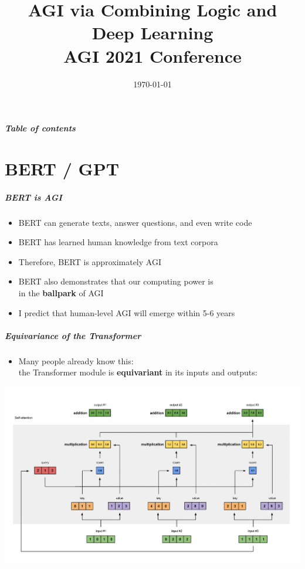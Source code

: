 \documentclass[16pt]{beamer}
\title[AGI via Logic]{{\Huge AGI via Combining Logic and Deep Learning}
 \\ \vspace*{0.4cm} AGI 2021 Conference}
\author{\cc{YKY}{YKY}} %
\date{\today} %
\makeatletter
\newcommand{\smiley}{$\vcenter{\hbox{\texttt{[image: ../smiling-face.png]}}}$}
\newif\ifframeinlbf
\newcommand\listofframes{\@starttoc{lbf}}
\makeatother
\begin{document}
\frameinlbffalse
\addtocounter{page}{-1}
\begin{frame}
\titlepage
\end{frame}

\addtocounter{page}{-1}
\begin{frame}[noframenumbering]
\frametitle{Table of contents}
\listofframes
\end{frame}



\frameinlbftrue

\part{BERT / GPT}
\frame{\partpage}

\begin{frame}
\frametitle{BERT is AGI}
\begin{itemize}
	\item BERT can generate texts, answer questions, and even write code
	\item BERT has learned human knowledge from text corpora
	\item Therefore, BERT is approximately AGI
	\item BERT also demonstrates that our computing power is \\
			 in the \textbf{ballpark} of AGI
	\item I predict that human-level AGI will emerge within 5-6 years
\end{itemize}
\end{frame}

\begin{frame}
\frametitle{Equivariance of the Transformer}
\begin{itemize}
	\item Many people already know this: \\
	the Transformer module is \textbf{equivariant} in its inputs and outputs:
\end{itemize}
\centering
\includegraphics[scale=0.2]{self-attention.png}
\end{frame}
\end{document}
